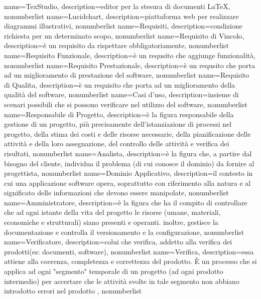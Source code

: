 {
name={TexStudio},
description={editor per la stesura di documenti \LaTeX},
nonumberlist 
}
{
name={Lucidchart},
description={piattaforma web per realizzare diagrammi illustrativi},
nonumberlist 
}
{
name={Requisiti},
description={condizione richiesta per un determinato scopo},
nonumberlist 
}
{
name={Requisito di Vincolo},
description={è un requisito da rispettare obbligatoriamente},
nonumberlist 
}
{
name={Requisito Funzionale},
description={è un requsito che aggiunge funzionalità},
nonumberlist 
}
{
name={Requisito Prestazionale},
description={è un requsito che porta ad un miglioramento di prestazione del software},
nonumberlist 
}
{
	name={Requisito di Qualita},
	description={è un requisito che porta ad un miglioramento della qualità del software},
	nonumberlist 
}
{
name={Casi d'uso},
description={insieme di scenari possibili che si possono verificare nel	utilizzo del software},
nonumberlist 
}
{
name={Responsabile di Progetto},
description={è la figura responsabile della gestione di un progetto, più precisamente dell'istanziazione di processi nel progetto, della stima dei costi e delle risorse necessarie, della pianificazione delle attività e della loro assegnazione, del controllo delle attività e verifica dei risultati},
nonumberlist 
}
{
name={Analista},
description={è la figura che, a partire dal bisogno del cliente, individua il problema (di cui conosce il dominio) da fornire al progettista},
nonumberlist 
}
{
name={Dominio Applicativo},
description={il contesto in cui una applicazione software opera, soprattutto con riferimento alla natura e al significato delle informazioni che devono essere manipolate},
nonumberlist 
}
{
name={Amministratore},
description={è la figura che ha il compito di controllare che ad ogni istante della vita del progetto le risorse (umane, materiali, economiche e strutturali) siano presenti e operanti. inoltre, gestisce la documentazione e controlla il versionamento e la configurazione},
nonumberlist 
}
{
name={Verificatore},
description={colui che verifica, addetto alla verifica dei prodotti(es: documenti, software)},
nonumberlist 
}
{
name={Verifica},
description={essa attiene alla coerenza, completezza e correttezza del prodotto. È un processo che si applica ad ogni "segmento" temporale di un progetto (ad ogni prodotto intermedio) per accertare che le attività svolte in tale segmento non abbiano introdotto errori nel prodotto
},
nonumberlist 
}
